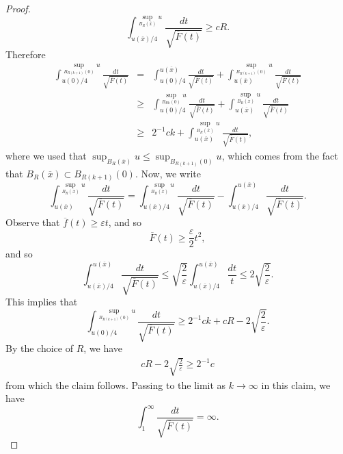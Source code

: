 \documentclass[10pt,a4paper]{amsart}
\begin{document}
\begin{proof}
$$
	\int_{u(\overline{x})/4}^{\sup_{B_R(\overline{x})}u}\frac{dt}{\sqrt{\overline{F}(t)}} \geq cR.
$$
Therefore
\begin{eqnarray*}
	\int_{u(0)/4}^{\sup_{B_{R(k+1)}(0)}u} \frac{dt}{\sqrt{\overline{F}(t)}} & = & \int_{u(0)/4}^{u(\overline{x})} \frac{dt}{\sqrt{\overline{F}(t)}} + \int_{u(\overline{x})}^{\sup_{B_{R(k+1)}(0)}u}\frac{dt}{\sqrt{\overline{F}(t)}}\\
	& \geq & \int_{u(0)/4}^{\sup_{B_{Rk}(0)} u} \frac{dt}{\sqrt{\overline{F}(t)}} + \int_{u(\overline{x})}^{\sup_{B_R(\overline{x})}u}\frac{dt}{\sqrt{\overline{F}(t)}}\\
	& \geq & 2^{-1}ck + \int_{u(\overline{x})}^{\sup_{B_{R}(\overline{x})}u}\frac{dt}{\sqrt{\overline{F}(t)}},
\end{eqnarray*}
where we used that $\sup_{B_R(\overline{x})}u \leq \sup_{B_{R(k+1)}(0)}u$, which comes from the fact that $B_R(\overline{x}) \subset B_{R(k+1)}(0)$. Now, we write
$$
	\int_{u(\overline{x})}^{\sup_{B_{R}(\overline{x})}u}\frac{dt}{\sqrt{\overline{F}(t)}} = \int_{u(\overline{x})/4}^{\sup_{B_{R}(\overline{x})}u}\frac{dt}{\sqrt{\overline{F}(t)}} - \int_{u(\overline{x})/4}^{u(\overline{x})}\frac{dt}{\sqrt{\overline{F}(t)}}.
$$
Observe that $\overline{f}(t) \geq \varepsilon t$, and so
$$
	\overline{F}(t) \geq \frac{\varepsilon}{2}t^2,
$$
and so
$$
 \int_{u(\overline{x})/4}^{u(\overline{x})}\frac{dt}{\sqrt{\overline{F}(t)}} \leq \sqrt{\frac{2}{\varepsilon}}\int_{u(\overline{x})/4}^{u(\overline{x})}\frac{dt}{t} \leq 2\sqrt{\frac{2}{\varepsilon}}.
$$
This implies that
$$
	\int_{u(0)/4}^{\sup_{B_{R(k+1)}(0)}u}\frac{dt}{\sqrt{\overline{F}(t)}} \geq 2^{-1}ck + cR  - 2\sqrt{\frac{2}{\varepsilon}}.
$$
By the choice of $R$, we have
\begin{eqnarray*}
   cR - 2\sqrt{\frac{2}{\varepsilon}} \geq 2^{-1}c
\end{eqnarray*}
from which the claim follows. Passing to the limit as $k \to \infty$ in this claim, we have
$$
    \int_{1}^\infty\frac{dt}{\sqrt{\overline{F}(t)}} = \infty.
$$
\end{proof}
\end{document}
